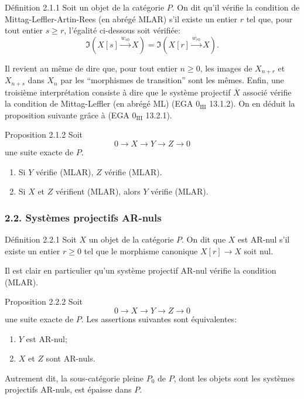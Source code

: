 \begin{statement}{Définition 2.1.1}
Soit un objet de la catégorie $P$. On dit qu'il vérifie la condition de Mittag-Leffler-Artin-Rees (en abrégé MLAR) s'il existe un entier $r$ tel que, pour tout entier $s\ge r$, l'égalité ci-dessous soit vérifiée:
\[
\Im(X[s]\xrightarrow{w_{s0}}X)=\Im(X[r]\xrightarrow{w_{r0}}X).
\]
\end{statement}
Il revient au même de dire que, pour tout entier $n\ge0$, les images de $X_{n+r}$ et $X_{n+s}$ dans $X_n$ par les ``morphismes de transition'' sont les mêmes. Enfin, une troisième interprétation consiste à dire que le système projectif $\overline X$ associé vérifie la condition de Mittag-Leffler (en abrégé ML) (EGA $0_{\mathrm{III}}$ 13.1.2). On en déduit la proposition suivante grâce à (EGA $0_{\mathrm{III}}$ 13.2.1).

\begin{statement}{Proposition 2.1.2}
Soit
\[
0\longrightarrow X\longrightarrow Y\longrightarrow Z\longrightarrow0
\]
une suite exacte de $P$.
\begin{enumerate}[label=(\roman*)]
\item Si $Y$ vérifie (MLAR), $Z$ vérifie (MLAR).
\item Si $X$ et $Z$ vérifient (MLAR), alors $Y$ vérifie (MLAR).
\end{enumerate}
\end{statement}

\subsubsection*{2.2. Systèmes projectifs AR-nuls}
\begin{statement}{Définition 2.2.1}
Soit $X$ un objet de la catégorie $P$. On dit que $X$ est AR-nul s'il existe un entier $r\ge0$ tel que le morphisme canonique $X[r]\to X$ soit nul.
\end{statement}
Il est
clair en particulier qu'un système projectif AR-nul vérifie la condition (MLAR).

\begin{statement}{Proposition 2.2.2}
Soit
\[
0\longrightarrow X\longrightarrow Y\longrightarrow Z\longrightarrow0
\]
une suite exacte de $P$. Les assertions suivantes sont équivalentes:
\begin{enumerate}[label=(\roman*)]
\item $Y$ est AR-nul;
\item $X$ et $Z$ sont AR-nuls.
\end{enumerate}
Autrement dit, la sous-catégorie pleine $P_0$ de $P$, dont les objets sont les systèmes projectifs AR-nuls, est épaisse dans $P$.
\end{statement}

